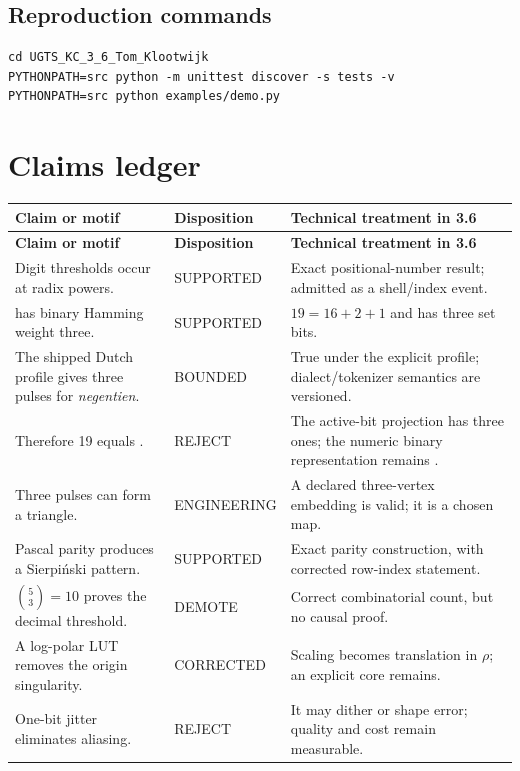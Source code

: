 \documentclass[10pt,a4paper]{article}
\newcommand{\code}[1]{\texttt{\detokenize{#1}}}
\begin{document}
\subsection{Reproduction commands}
\begin{Verbatim}[fontsize=\small,frame=single]
cd UGTS_KC_3_6_Tom_Klootwijk
PYTHONPATH=src python -m unittest discover -s tests -v
PYTHONPATH=src python examples/demo.py
\end{Verbatim}

\section{Claims ledger}
\begin{longtable}{>{\raggedright\arraybackslash}p{4.5cm}>{\raggedright\arraybackslash}p{2.4cm}>{\raggedright\arraybackslash}p{8.5cm}}
\toprule
\textbf{Claim or motif} & \textbf{Disposition} & \textbf{Technical treatment in 3.6} \\
\midrule
\endfirsthead
\toprule
\textbf{Claim or motif} & \textbf{Disposition} & \textbf{Technical treatment in 3.6} \\
\midrule
\endhead
Digit thresholds occur at radix powers. & SUPPORTED & Exact positional-number result; admitted as a shell/index event. \\
19 has binary Hamming weight three. & SUPPORTED & $19=16+2+1$ and \code{10011} has three set bits. \\
The shipped Dutch profile gives three pulses for \emph{negentien}. & BOUNDED & True under the explicit profile; dialect/tokenizer semantics are versioned. \\
Therefore 19 equals \code{111}. & REJECT & The active-bit projection has three ones; the numeric binary representation remains \code{10011}. \\
Three pulses can form a triangle. & ENGINEERING & A declared three-vertex embedding is valid; it is a chosen map. \\
Pascal parity produces a Sierpiński pattern. & SUPPORTED & Exact parity construction, with corrected row-index statement. \\
$\binom{5}{3}=10$ proves the decimal threshold. & DEMOTE & Correct combinatorial count, but no causal proof. \\
A log-polar LUT removes the origin singularity. & CORRECTED & Scaling becomes translation in $\rho$; an explicit core remains. \\
One-bit jitter eliminates aliasing. & REJECT & It may dither or shape error; quality and cost remain measurable. \\

\end{longtable}
\end{document}
